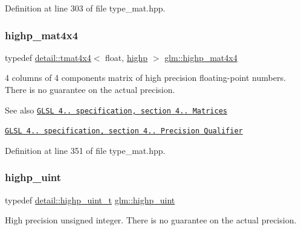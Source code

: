 Definition at line 303 of file type\+\_\+mat.\+hpp.

\mbox{\label{group__core__precision_ga231950d260be295a25d7340e2020f55c}} 
\subsubsection{\texorpdfstring{highp\+\_\+mat4x4}{highp\_mat4x4}}
{\footnotesize\ttfamily typedef \hyperlink{structglm_1_1detail_1_1tmat4x4}{detail\+::tmat4x4}$<$ float, \hyperlink{namespaceglm_a0f04f086094c747d227af4425893f545ac6f7eab42eacbb10d59a58e95e362074}{highp} $>$ \hyperlink{group__core__precision_ga231950d260be295a25d7340e2020f55c}{glm\+::highp\+\_\+mat4x4}}

4 columns of 4 components matrix of high precision floating-\/point numbers. There is no guarantee on the actual precision.

\begin{DoxySeeAlso}{See also}
\href{http://www.opengl.org/registry/doc/GLSLangSpec.4.20.8.pdf}{\tt G\+L\+SL 4.. specification, section 4.. Matrices} 

\href{http://www.opengl.org/registry/doc/GLSLangSpec.4.20.8.pdf}{\tt G\+L\+SL 4.. specification, section 4.. Precision Qualifier} 
\end{DoxySeeAlso}


Definition at line 351 of file type\+\_\+mat.\+hpp.

\mbox{\label{group__core__precision_gabfd1cf11193324a5f77d3831b6ac3205}} 
\subsubsection{\texorpdfstring{highp\+\_\+uint}{highp\_uint}}
{\footnotesize\ttfamily typedef \hyperlink{namespaceglm_1_1detail_a994c05c8a976cc902a7cd193ad36bbba}{detail\+::highp\+\_\+uint\+\_\+t} \hyperlink{group__core__precision_gabfd1cf11193324a5f77d3831b6ac3205}{glm\+::highp\+\_\+uint}}

High precision unsigned integer. There is no guarantee on the actual precision.

